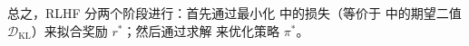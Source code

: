 总之，RLHF 分两个阶段进行：首先通过最小化  中的损失（等价于  中的期望二值 $\mathcal{D}_{\mathrm{KL}}$）来拟合奖励 $r^*$；然后通过求解  来优化策略 $\pi^*$。


\newpage



